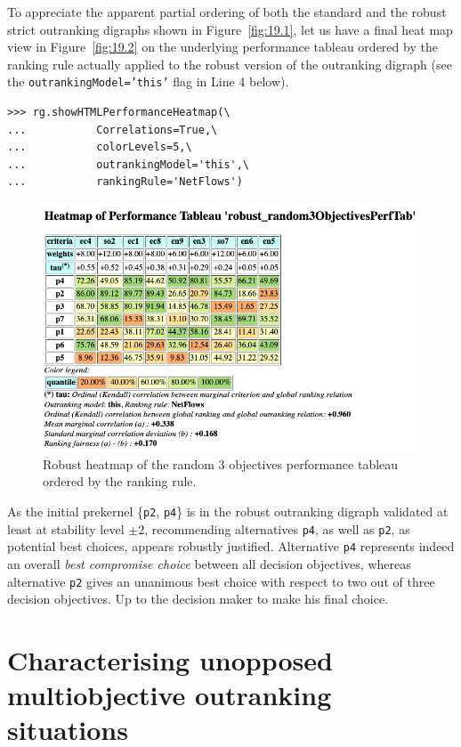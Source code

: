 To appreciate the apparent partial ordering of both the standard and the robust strict outranking digraphs shown in Figure~\vref{fig:19.1}, let us have a final heat map view in Figure~\vref{fig:19.2} on the underlying performance tableau ordered by the \NetFlows ranking rule actually applied to the robust version of the outranking digraph (see the \texttt{outrankingModel='this'} flag in Line 4 below).
\begin{lstlisting}[caption={Computing a robust performance heatmap view},label=list:19.9]
>>> rg.showHTMLPerformanceHeatmap(\
...           Correlations=True,\
...           colorLevels=5,\
...           outrankingModel='this',\
...           rankingRule='NetFlows')
\end{lstlisting}
\begin{figure}[ht]
\includegraphics[width=\hsize]{Figures/19-2-robustHeatmap.png}
\caption{Robust heatmap of the random 3 objectives performance tableau ordered by the \NetFlows ranking rule.} 
\label{fig:19.2}       %
\end{figure}
 As the initial prekernel \{\texttt{p2}, \texttt{p4}\} is in the robust outranking digraph validated at least at stability level $\pm 2$, recommending alternatives \texttt{p4}, as well as \texttt{p2}, as potential best choices, appears robustly justified. Alternative \texttt{p4} represents indeed an overall \emph{best compromise choice} between all decision objectives, whereas alternative \texttt{p2} gives an unanimous best choice with respect to two out of three decision objectives. Up to the decision maker to make his final choice.

\section{Characterising unopposed multiobjective outranking situations}
\label{sec:19.5}

